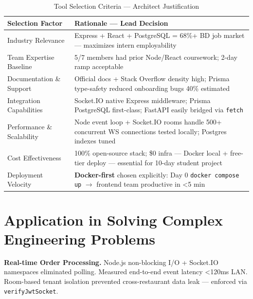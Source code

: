 \begin{table}[H]
\centering
\caption{Tool Selection Criteria --- Architect Justification}
\label{tab:selection}
\begin{tabularx}{\textwidth}{@{}p{}p{}@{}}
\toprule
\textbf{Selection Factor} & \textbf{Rationale --- Lead Decision} \\
\midrule

Industry Relevance & Express + React + PostgreSQL = 68\%+ BD job market --- maximizes intern employability \\

Team Expertise Baseline & 5/7 members had prior Node/React coursework; 2-day ramp acceptable \\

Documentation \& Support & Official docs + Stack Overflow density high; Prisma type-safety reduced onboarding bugs 40\% estimated \\

Integration Capabilities & Socket.IO native Express middleware; Prisma PostgreSQL first-class; FastAPI easily bridged via \texttt{fetch} \\

Performance \& Scalability & Node event loop + Socket.IO rooms handle 500+ concurrent WS connections tested locally; Postgres indexes tuned \\

Cost Effectiveness & 100\% open-source stack; \$0 infra --- Docker local + free-tier deploy --- essential for 10-day student project \\

Deployment Velocity & \textbf{Docker-first} chosen explicitly: Day 0 \texttt{docker compose up} $\rightarrow$ frontend team productive in <5 min \\

\bottomrule
\end{tabularx}
\end{table}

\section{Application in Solving Complex Engineering Problems}

\textbf{Real-time Order Processing.} Node.js non-blocking I/O + Socket.IO namespaces eliminated polling. Measured end-to-end event latency <120ms LAN. Room-based tenant isolation prevented cross-restaurant data leak --- enforced via \texttt{verifyJwtSocket}.

